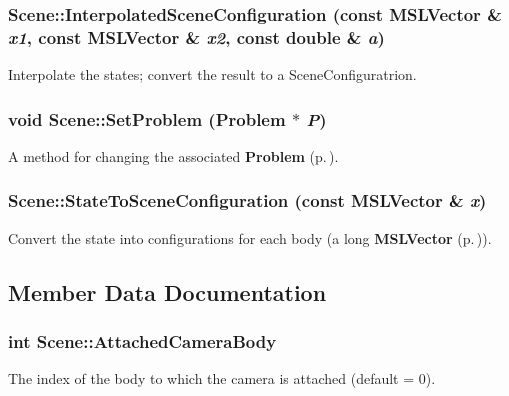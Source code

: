 \subsubsection{ Scene::Interpolated\-Scene\-Configuration (const {\bf MSLVector} \& {\em x1}, const {\bf MSLVector} \& {\em x2}, const double \& {\em a})\hspace{0.3cm}{\tt  [virtual]}}\label{classScene_a4}


Interpolate the states; convert the result to a Scene\-Configuratrion.

\subsubsection{\setlength{\rightskip}{0pt plus 5cm}void Scene::Set\-Problem ({\bf Problem} $\ast$ {\em P})}\label{classScene_a2}


A method for changing the associated {\bf Problem} {\rm (p.\,\pageref{classProblem})}.

\subsubsection{ Scene::State\-To\-Scene\-Configuration (const {\bf MSLVector} \& {\em x})\hspace{0.3cm}{\tt  [virtual]}}\label{classScene_a3}


Convert the state into configurations for each body (a long {\bf MSLVector} {\rm (p.\,\pageref{classMSLVector})}).



\subsection{Member Data Documentation}
\subsubsection{\setlength{\rightskip}{0pt plus 5cm}int Scene::Attached\-Camera\-Body}\label{classScene_m12}


The index of the body to which the camera is attached (default = 0).

